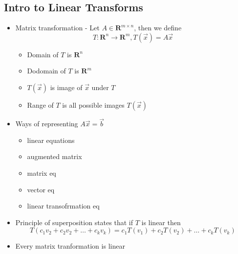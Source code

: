 \documentclass{article}
\begin{document}
\subsection{Intro to Linear Transforms}
\begin{itemize}
    \item Matrix transformation - Let \(A\in\textbf{R}^{m\times n}\), then we define \[T:\textbf{R}^n\rightarrow\textbf{R}^m, T(\vec{x})=A\vec{x}\]
    \begin{itemize}
        \item Domain of \(T\) is \(\textbf{R}^n\)
        \item Dodomain of \(T\) is \(\textbf{R}^m\)
        \item \(T(\vec{x})\) is image of \(\vec{x}\) under \(T\)
        \item Range of \(T\) is all possible images \(T(\vec{x})\)
    \end{itemize}
    \item Ways of representing \(A\vec{x}=\vec{b}\)
    \begin{itemize}
        \item linear equations 
        \item augmented matrix 
        \item matrix eq 
        \item vector eq 
        \item linear transofrmation eq
    \end{itemize}
    \item Principle of superposition states that if \(T\) is linear then \[T(c_1v_2+c_2v_2+\dots+c_kv_k)=c_1T(v_1)+c_2T(v_2)+\dots+c_kT(v_k)\]
    \item Every matrix tranformation is linear
\end{itemize}
\end{document}
